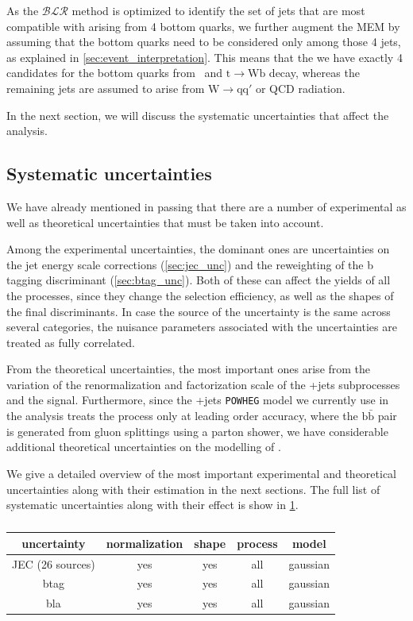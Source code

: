 As the $\mathcal{BLR}$ method is optimized to identify the set of jets that are most compatible with arising from 4 bottom quarks, we further augment the MEM by assuming that the bottom quarks need to be considered only among those 4 jets, as explained in \cref{sec:event_interpretation}. This means that the we have exactly 4 candidates for the bottom quarks from \Hbb~and $\mathrm{t} \rightarrow \mathrm{W} \mathrm{b}$ decay, whereas the remaining jets are assumed to arise from $\mathrm{W} \rightarrow \mathrm{q} \mathrm{q}'$ or QCD radiation. 

In the next section, we will discuss the systematic uncertainties that affect the analysis.

\subsection{Systematic uncertainties}
\label{sec:systematic_unc}
We have already mentioned in passing that there are a number of experimental as well as theoretical uncertainties that must be taken into account.

Among the experimental uncertainties, the dominant ones are uncertainties on the jet energy scale corrections (\cref{sec:jec_unc}) and the reweighting of the b tagging discriminant (\cref{sec:btag_unc}). Both of these can affect the yields of all the processes, since they change the selection efficiency, as well as the shapes of the final discriminants. In case the source of the uncertainty is the same across several categories, the nuisance parameters associated with the uncertainties are treated as fully correlated.

From the theoretical uncertainties, the most important ones arise from the variation of the renormalization and factorization scale of the \ttbar+jets subprocesses and the \ttH signal. Furthermore, since the \ttbar+jets \texttt{POWHEG} model we currently use in the analysis treats the \ttbb process only at leading order accuracy, where the $\mathrm{b}\bar{\mathrm{b}}$ pair is generated from gluon splittings using a parton shower, we have considerable additional theoretical uncertainties on the modelling of \ttbb.

We give a detailed overview of the most important experimental and theoretical uncertainties along with their estimation in the next sections. The full list of systematic uncertainties along with their effect is show in \cref{tab:systematic_uncertainties}.

\begin{table}[h!]

\begin{center}
\caption{}
\label{tab:systematic_uncertainties}
\begin{tabular}{c|cccc}
\hline
uncertainty & normalization & shape & process & model \\
\hline
JEC (26 sources) & yes & yes & all & gaussian \\
btag & yes & yes & all & gaussian \\
\hline
bla & yes & yes & all & gaussian \\
\hline
\hline
\end{tabular}
\end{center}
\end{table}

